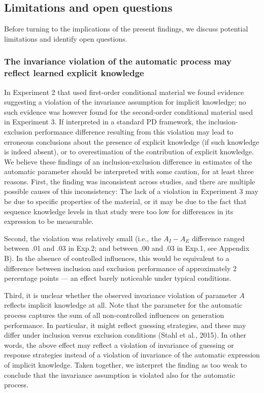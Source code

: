 \documentclass[jou]{apa6}
\theoremstyle{definition}
\theoremstyle{definition}
\theoremstyle{definition}
\theoremstyle{remark}
\begin{document}
\subsection{Limitations and open
questions}\label{limitations-and-open-questions}

Before turning to the implications of the present findings, we discuss
potential limitations and identify open questions.

\subsubsection{The invariance violation of the automatic process may
reflect learned explicit
knowledge}\label{the-invariance-violation-of-the-automatic-process-may-reflect-learned-explicit-knowledge}

In Experiment 2 that used first-order conditional material we found
evidence suggesting a violation of the invariance assumption for
implicit knowledge; no such evidence was however found for the
second-order conditional material used in Experiment 3. If interpreted
in a standard PD framework, the inclusion-exclusion performance
difference resulting from this violation may lead to erroneous
conclusions about the presence of explicit knowledge (if such knowledge
is indeed absent), or to overestimation of the contribution of explicit
knowledge. We believe these findings of an inclusion-exclusion
difference in estimates of the automatic parameter should be interpreted
with some caution, for at least three reasons. First, the finding was
inconsistent across studies, and there are multiple possible causes of
this inconsistency: The lack of a violation in Experiment 3 may be due
to specific properties of the material, or it may be due to the fact
that sequence knowledge levels in that study were too low for
differences in its expression to be measurable.

Second, the violation was relatively small (i.e., the \(A_{I}-A_{E}\)
difference ranged between .01 and .03 in Exp.2; and between .00 and .03
in Exp.1, see Appendix B). In the absence of controlled influences, this
would be equivalent to a difference between inclusion and exclusion
performance of approximately 2 percentage points --- an effect barely
noticeable under typical conditions.

Third, it is unclear whether the observed invariance violation of
parameter \(A\) reflects implicit knowledge at all. Note that the
parameter for the automatic process captures the sum of all
non-controlled influences on generation performance. In particular, it
might reflect guessing strategies, and these may differ under inclusion
versus exclusion conditions (Stahl et al., 2015). In other words, the
above effect may reflect a violation of invariance of guessing or
response strategies instead of a violation of invariance of the
automatic expression of implicit knowledge. Taken together, we interpret
the finding as too weak to conclude that the invariance assumption is
violated also for the automatic process.
\end{document}

